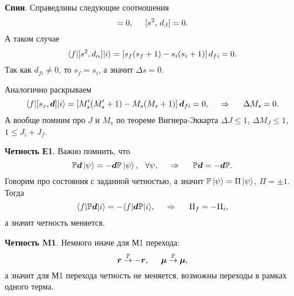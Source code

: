 
\textbf{Спин}. Справедливы следующие соотношения
\begin{equation*}
	[s_\alpha,\, d_\beta] = 0,
	\hspace{5 mm} 
	[s^2,\, d_\beta] = 0.
\end{equation*}
А таком случае
\begin{equation*}
	\bk{f}[ [s^2, d_\alpha] ]{i} = \left[
		s_f (s_f + 1) - s_i (s_i + 1)
	\right] d_{fi} = 0.
\end{equation*}
Так как $d_{fi} \neq 0$, то $s_f = s_i$, а значит $\Delta s = 0$.

Аналогично раскрываем
\begin{equation*}
	\bk{f}[ [s_z, \vc{d}] ]{i} = \left[
		M_s'(M_s' + 1) - M_s (M_s + 1)
	\right] \vc{d}_{fi} = 0,
	\hspace{0.5cm} \Rightarrow \hspace{0.5cm}
	\Delta M_s = 0.
\end{equation*}
А вообще помним про $J$ и $M_s$ по теореме Вигнера-Эккарта $\Delta J \leq 1$, $\Delta M_J \leq 1$, $1 \leq J_i + J_f$. 

\textbf{Четность Е1}. Важно помнить, что
\begin{equation*}
	\mathbb{P} \mbox{\boldmath $d$} \left| \psi \right\rangle = - \mbox{\boldmath $d$} \mathbb{P} \left| \psi \right\rangle,
	\hspace{2.5 mm} 
	\forall \psi,
	\hspace{0.5cm} \Rightarrow \hspace{0.5cm}
	\mathbb{P} \mbox{\boldmath $d$} = - \mbox{\boldmath $d$} \mathbb{P}.
\end{equation*}
Говорим про состояния с заданной четностью, а значит $\mathbb{P} \left| \psi \right\rangle = \Pi \left| \psi \right\rangle$, $\Pi = \pm 1$. Тогда 
\begin{equation*}
	\bk{f}[\mathbb{P} \vc{d}]{i} = - \bk{f}[\vc{d} \mathbb{P}]{i},
	\hspace{0.5cm} \Rightarrow \hspace{0.5cm}
	\Pi_f = - \Pi_i,
\end{equation*}
а значит четность меняется. 

\textbf{Четность M1}. Немного иначе для М1 перехода:
\begin{equation*}
	\mbox{\boldmath $r$} \overset{\mathbb{P}}{\to}  - \mbox{\boldmath $r$},
	\hspace{5 mm} 
	\mbox{\boldmath $\mu$} \overset{\mathbb{P}}{\to} \mbox{\boldmath $\mu$}, 
\end{equation*}
а значит для М1 перехода четность не меняется, возможны переходы в рамках одного терма. 